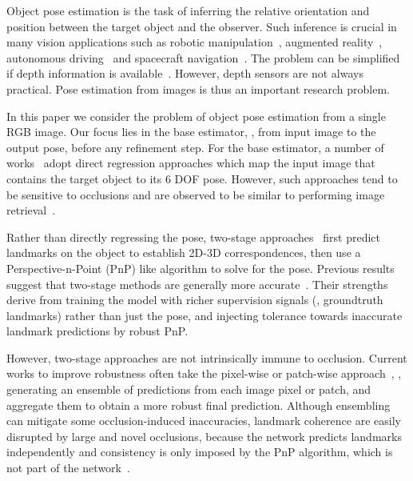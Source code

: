 \documentclass[10pt,twocolumn,letterpaper]{article}
\begin{document}
Object pose estimation is the task of inferring the relative orientation and position between the target object and the observer. Such inference is crucial in many vision applications such as robotic manipulation~\cite{Zuo2019craves, zhu2014single, collet2011moped}, augmented reality~\cite{marchand2015pose, crivellaro2018robust}, autonomous driving~\cite{chen2017multi, wu20196d, xu2018pointfusion} and spacecraft navigation~\cite{Cassinis2019review, sharma2018pose}. The problem can be simplified if depth information is available~\cite{michel2017global, wang2019densefusion, He2020pvn3d, chen2021fs}. However, depth sensors are not always practical. Pose estimation from images is thus an important research problem.

In this paper we consider the problem of object pose estimation from a single RGB image. Our focus lies in the base estimator, \ie, from input image to the output pose, before any refinement step. For the base estimator, a number of works~\cite{Kehl2017ssd,Xiang2018posecnn,poirson2016fast,do2018deep} adopt direct regression approaches which map the input image that contains the target object to its 6 DOF pose. However, such approaches tend to be sensitive to occlusions and are observed to be similar to performing image retrieval~\cite{sattler2019understanding}.





Rather than directly regressing the pose, two-stage approaches~\cite{Hu2019segmentation, Jafari2018ipose, Li2019cdpn, Oberweger2018making, Park2019pix2pose, Peng2019pvnet, rad2017bb8, Zakharov2019dpod, song2020hybridpose, pavlakos20176, tekin2018real} first predict landmarks on the object to establish 2D-3D correspondences, then use a Perspective-n-Point (PnP) like algorithm to solve for the pose. Previous results suggest that two-stage methods are generally more accurate~\cite{Oberweger2018making, Hu2020single}. Their strengths derive from training the model with richer supervision signals (\ie, groundtruth landmarks) rather than just the pose, and injecting tolerance towards inaccurate landmark predictions by robust PnP.

However, two-stage approaches are not intrinsically immune to occlusion. Current works to improve robustness often take the pixel-wise or patch-wise approach~\cite{Peng2019pvnet, Oberweger2018making, Hu2019segmentation, Jafari2018ipose, Li2019cdpn, Park2019pix2pose}, \ie, generating an ensemble of predictions from each image pixel or patch, and aggregate them to obtain a more robust final prediction. Although ensembling can mitigate some occlusion-induced inaccuracies, landmark coherence are easily disrupted by large and novel occlusions, because the network predicts landmarks independently and consistency is only imposed by the PnP algorithm, which is not part of the network~\cite{Hu2020single}. 
\end{document}
